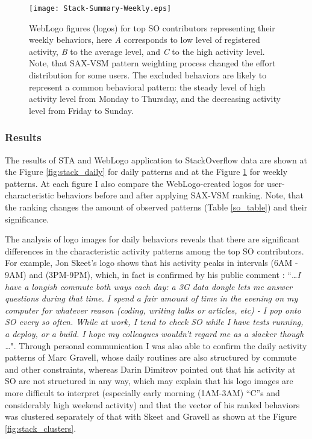 \begin{figure}[t]
   \centering
   \texttt{[image: Stack-Summary-Weekly.eps]}
   \caption{WebLogo figures (logos) for top SO contributors representing their weekly behaviors, here \textit{A} corresponds to low level of registered activity, \textit{B} to the average level, and \textit{C} to the high activity level. Note, that SAX-VSM pattern weighting process changed the effort distribution for some users. The excluded behaviors are likely to represent a common behavioral pattern: the steady level of high activity level from Monday to Thursday, and the decreasing activity level from Friday to Sunday.}
   \label{fig:stack_weekly}   
\end{figure}

\subsubsection{Results}
The results of STA and WebLogo application to StackOverflow data are shown at the Figure \ref{fig:stack_daily} for daily patterns and at the Figure \ref{fig:stack_weekly} for weekly patterns. At each figure I also compare the WebLogo-created logos for user-characteristic behaviors before and after applying SAX-VSM ranking. Note, that the ranking changes the amount of observed patterns (Table \ref{so_table}) and their significance.

The analysis of logo images for daily behaviors reveals that there are significant differences in the characteristic activity patterns among the top SO contributors. For example, Jon Skeet's logo shows that his activity peaks in intervals (6AM - 9AM) and (3PM-9PM), which, in fact is confirmed by his public comment \cite{skeet}: ``\textit{\dots I have a longish commute both ways each day: a 3G data dongle lets me answer questions during that time. I spend a fair amount of time in the evening on my computer for whatever reason (coding, writing talks or articles, etc) - I pop onto SO every so often. While at work, I tend to check SO while I have tests running, a deploy, or a build. I hope my colleagues wouldn't regard me as a slacker though \dots}". Through personal communication I was also able to confirm the daily activity patterns of Marc Gravell, whose daily routines are also structured by commute and other constraints, whereas Darin Dimitrov pointed out that his activity at SO are not structured in any way, which may explain that his logo images are more difficult to interpret (especially early morning (1AM-3AM) ``C''s and considerably high weekend activity) and that the vector of his ranked behaviors was clustered separately of that with Skeet and Gravell as shown at the Figure \ref{fig:stack_clusters}.

